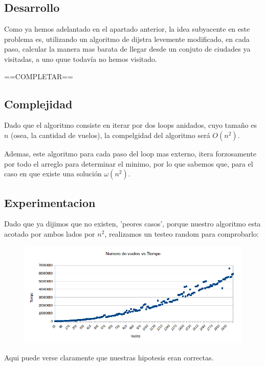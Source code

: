 \subsection{Desarrollo}
Como ya hemos adelantado en el apartado anterior, la idea subyacente en este problema es, utilizando un algoritmo de dijstra levemente modificado, en cada paso, calcular la manera mas barata de llegar desde un conjuto de ciudades ya visitadas, a uno quue todavía no hemos visitado.

==COMPLETAR==

\subsection{Complejidad}

Dado que el algoritmo consiste en iterar por dos loops anidados, cuyo tamaño es $n$ (osea, la cantidad de vuelos), la compelgidad del algoritmo será $O(n^2)$.

Ademas, este algoritmo para cada paso del loop mas externo, itera forzosamente por todo el arreglo para determinar el minimo, por lo que sabemos que, para el caso en que existe una solución $\omega (n^2)$.

\subsection{Experimentacion}

Dado que ya dijimos que no existen, 'peores casos', porque nuestro algoritmo esta acotado por ambos lados por $n^2$, realizamos un testeo random para comprobarlo:

\begin{figure}[h!]
  \begin{center}
	\includegraphics[scale=0.5]{Ej1/testingnvst.png}
	\label{nombreparareferenciar}
  \end{center}
\end{figure}

Aqui puede verse claramente que nuestras hipotesis eran correctas.